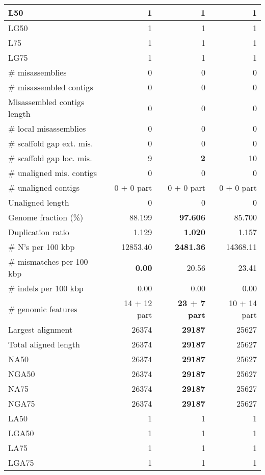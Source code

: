 \documentclass[12pt,a4paper]{article}
\begin{document}
\begin{table}[ht]
\begin{center}
\begin{tabular}{|l*{3}{|r}|}
L50 & 1 & 1 & 1 \\ \hline
LG50 & 1 & 1 & 1 \\ \hline
L75 & 1 & 1 & 1 \\ \hline
LG75 & 1 & 1 & 1 \\ \hline
\# misassemblies & 0 & 0 & 0 \\ \hline
\# misassembled contigs & 0 & 0 & 0 \\ \hline
Misassembled contigs length & 0 & 0 & 0 \\ \hline
\# local misassemblies & 0 & 0 & 0 \\ \hline
\# scaffold gap ext. mis. & 0 & 0 & 0 \\ \hline
\# scaffold gap loc. mis. & 9 & {\bf 2} & 10 \\ \hline
\# unaligned mis. contigs & 0 & 0 & 0 \\ \hline
\# unaligned contigs & 0 + 0 part & 0 + 0 part & 0 + 0 part \\ \hline
Unaligned length & 0 & 0 & 0 \\ \hline
Genome fraction (\%) & 88.199 & {\bf 97.606} & 85.700 \\ \hline
Duplication ratio & 1.129 & {\bf 1.020} & 1.157 \\ \hline
\# N's per 100 kbp & 12853.40 & {\bf 2481.36} & 14368.11 \\ \hline
\# mismatches per 100 kbp & {\bf 0.00} & 20.56 & 23.41 \\ \hline
\# indels per 100 kbp & 0.00 & 0.00 & 0.00 \\ \hline
\# genomic features & 14 + 12 part & {\bf 23 + 7 part} & 10 + 14 part \\ \hline
Largest alignment & 26374 & {\bf 29187} & 25627 \\ \hline
Total aligned length & 26374 & {\bf 29187} & 25627 \\ \hline
NA50 & 26374 & {\bf 29187} & 25627 \\ \hline
NGA50 & 26374 & {\bf 29187} & 25627 \\ \hline
NA75 & 26374 & {\bf 29187} & 25627 \\ \hline
NGA75 & 26374 & {\bf 29187} & 25627 \\ \hline
LA50 & 1 & 1 & 1 \\ \hline
LGA50 & 1 & 1 & 1 \\ \hline
LA75 & 1 & 1 & 1 \\ \hline
LGA75 & 1 & 1 & 1 \\ \hline
\end{tabular}
\end{center}
\end{table}
\end{document}
